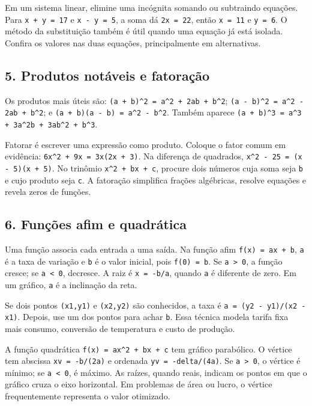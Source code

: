 \documentclass[11pt,a4paper]{article}
\begin{document}
Em um sistema linear, elimine uma incógnita somando ou subtraindo equações. Para \texttt{x + y = 17} e \texttt{x - y = 5}, a soma dá \texttt{2x = 22}, então \texttt{x = 11} e \texttt{y = 6}. O método da substituição também é útil quando uma equação já está isolada. Confira os valores nas duas equações, principalmente em alternativas.

\subsection*{5. Produtos notáveis e fatoração}

Os produtos mais úteis são: \texttt{(a + b)\textasciicircum{}2 = a\textasciicircum{}2 + 2ab + b\textasciicircum{}2}; \texttt{(a - b)\textasciicircum{}2 = a\textasciicircum{}2 - 2ab + b\textasciicircum{}2}; e \texttt{(a + b)(a - b) = a\textasciicircum{}2 - b\textasciicircum{}2}. Também aparece \texttt{(a + b)\textasciicircum{}3 = a\textasciicircum{}3 + 3a\textasciicircum{}2b + 3ab\textasciicircum{}2 + b\textasciicircum{}3}.

Fatorar é escrever uma expressão como produto. Coloque o fator comum em evidência: \texttt{6x\textasciicircum{}2 + 9x = 3x(2x + 3)}. Na diferença de quadrados, \texttt{x\textasciicircum{}2 - 25 = (x - 5)(x + 5)}. No trinômio \texttt{x\textasciicircum{}2 + bx + c}, procure dois números cuja soma seja \texttt{b} e cujo produto seja \texttt{c}. A fatoração simplifica frações algébricas, resolve equações e revela zeros de funções.

\subsection*{6. Funções afim e quadrática}

Uma função associa cada entrada a uma saída. Na função afim \texttt{f(x) = ax + b}, \texttt{a} é a taxa de variação e \texttt{b} é o valor inicial, pois \texttt{f(0) = b}. Se \texttt{a > 0}, a função cresce; se \texttt{a < 0}, decresce. A raiz é \texttt{x = -b/a}, quando \texttt{a} é diferente de zero. Em um gráfico, \texttt{a} é a inclinação da reta.

Se dois pontos \texttt{(x1,y1)} e \texttt{(x2,y2)} são conhecidos, a taxa é \texttt{a = (y2 - y1)/(x2 - x1)}. Depois, use um dos pontos para achar \texttt{b}. Essa técnica modela tarifa fixa mais consumo, conversão de temperatura e custo de produção.

A função quadrática \texttt{f(x) = ax\textasciicircum{}2 + bx + c} tem gráfico parabólico. O vértice tem abscissa \texttt{xv = -b/(2a)} e ordenada \texttt{yv = -delta/(4a)}. Se \texttt{a > 0}, o vértice é mínimo; se \texttt{a < 0}, é máximo. As raízes, quando reais, indicam os pontos em que o gráfico cruza o eixo horizontal. Em problemas de área ou lucro, o vértice frequentemente representa o valor otimizado.
\end{document}
